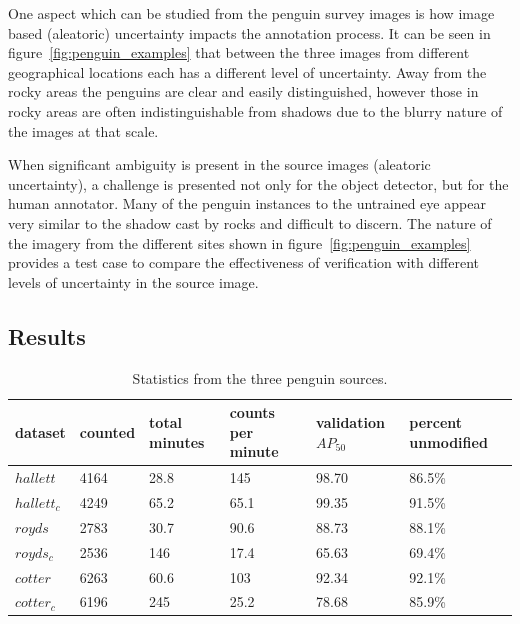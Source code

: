 One aspect which can be studied from the penguin survey images is how image based (aleatoric) uncertainty impacts the annotation process. It can be seen in figure~\ref{fig:penguin_examples} that between the three images from different geographical locations each has a different level of uncertainty. Away from the rocky areas the penguins are clear and easily distinguished, however those in rocky areas are often indistinguishable from shadows due to the blurry nature of the images at that scale.

When significant ambiguity is present in the source images (aleatoric uncertainty), a challenge is presented not only for the object detector, but for the human annotator. Many of the penguin instances to the untrained eye appear very similar to the shadow cast by rocks and difficult to discern. The nature of the imagery from the different sites shown in figure~\ref{fig:penguin_examples} provides a test case to compare the effectiveness of verification with different levels of uncertainty in the source image. 


\subsection{Results}
\label{sec:penguin_results}

\begin{table}[ht!]
  \centering
    \caption{Statistics from the three penguin sources. }
\begin{tabular}{llllll}
dataset     & counted & total minutes & counts per minute & validation $AP_{50}$ & percent unmodified \\
\toprule
$hallett$   & 4164    & 28.8          & 145               & 98.70     & 86.5\%   \\
$hallett_c$ & 4249    & 65.2          & 65.1              & 99.35     & 91.5\%   \\
$royds$     & 2783    & 30.7          & 90.6              & 88.73     & 88.1\%   \\
$royds_c$   & 2536    & 146           & 17.4              & 65.63     & 69.4\%   \\
$cotter$    & 6263    & 60.6          & 103               & 92.34     & 92.1\%   \\
$cotter_c$  & 6196    & 245           & 25.2              & 78.68     & 85.9\%  \\
\bottomrule
\end{tabular}

\label{tab:penguin_statistics}
\end{table}

